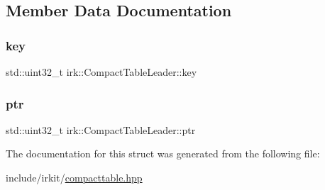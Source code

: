 \subsection{Member Data Documentation}
\mbox{\label{structirk_1_1CompactTableLeader_a6f10d4fa31ada93273d6eb0ffd340d83}} 
\subsubsection{\texorpdfstring{key}{key}}
{\footnotesize\ttfamily std\+::uint32\+\_\+t irk\+::\+Compact\+Table\+Leader\+::key}

\mbox{\label{structirk_1_1CompactTableLeader_ad0809dc1fada76cebf3b69629475da60}} 
\subsubsection{\texorpdfstring{ptr}{ptr}}
{\footnotesize\ttfamily std\+::uint32\+\_\+t irk\+::\+Compact\+Table\+Leader\+::ptr}



The documentation for this struct was generated from the following file\+:\begin{DoxyCompactItemize}
\item 
include/irkit/\mbox{\hyperlink{compacttable_8hpp}{compacttable.\+hpp}}\end{DoxyCompactItemize}
